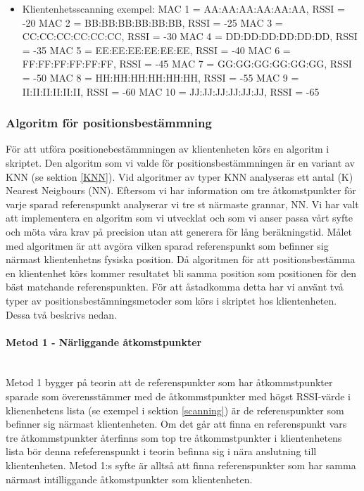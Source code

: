 \documentclass[swedish, a4paper,12pt]{article}
\begin{document}
  \begin{itemize}
  \item Klientenhetsscanning exempel:
        \newline MAC 1 = AA:AA:AA:AA:AA:AA,  RSSI = -20
        \newline MAC 2 = BB:BB:BB:BB:BB:BB,  RSSI = -25
        \newline MAC 3 = CC:CC:CC:CC:CC:CC,  RSSI = -30
        \newline MAC 4 = DD:DD:DD:DD:DD:DD,  RSSI = -35
        \newline MAC 5 = EE:EE:EE:EE:EE:EE,  RSSI = -40
        \newline MAC 6 = FF:FF:FF:FF:FF:FF,  RSSI = -45
        \newline MAC 7 = GG:GG:GG:GG:GG:GG,  RSSI = -50
        \newline MAC 8 = HH:HH:HH:HH:HH:HH,  RSSI = -55
        \newline MAC 9 = II:II:II:II:II:II,  RSSI = -60
        \newline MAC 10 = JJ:JJ:JJ:JJ:JJ:JJ,  RSSI = -65
  \end{itemize}

\subsubsection{Algoritm för positionsbestämmning}
För att utföra positionebestämmningen av klientenheten körs en algoritm i skriptet. Den algoritm som vi valde för positionsbestämmningen är en variant av KNN (se sektion \ref{KNN}). Vid algoritmer av typer KNN analyseras ett antal (K) Nearest Neigbours (NN). Eftersom vi har information om tre åtkomstpunkter för varje sparad referenspunkt analyserar vi tre st närmaste grannar, NN. Vi har valt att implementera en algoritm som vi utvecklat och som vi anser passa vårt syfte och möta våra krav på precision utan att generera för lång beräkningstid. Målet med algoritmen är att avgöra vilken sparad referenspunkt som befinner sig närmast klientenhetns fysiska position. Då algoritmen för att positionsbestämma en klientenhet körs kommer resultatet bli samma position som positionen för den bäst matchande referenspunkten.
För att åstadkomma detta har vi använt två typer av positionsbestämningsmetoder som körs i skriptet hos klientenheten. Dessa två beskrivs nedan.

\paragraph{Metod 1 - Närliggande åtkomstpunkter}
\leavevmode\\
Metod 1 bygger på teorin att de referenspunkter som har åtkommstpunkter sparade som överensstämmer med de åtkommstpunkter med högst RSSI-värde i klienenhetens lista (se exempel i sektion \ref{scanning}) är de referenspunkter som befinner sig närmast klientenheten. Om det går att finna en referenspunkt vars tre åtkommstpunkter återfinns som top tre åtkommstpunkter i klientenhetens lista bör denna refeferenspunkt i teorin befinna sig i nära anslutning till klientenheten.
Metod 1:s syfte är alltså att finna referenspunkter som har samma närmast intilliggande åtkomstpunkter som klientenheten.
\end{document}
